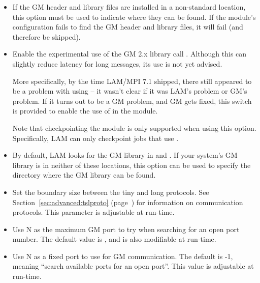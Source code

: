 \begin{itemize}


\item {}
  
  If the GM header and library files are installed in a non-standard
  location, this option must be used to indicate where they can be
  found.  If the  module's configuration fails to find the GM
  header and library files, it will fail (and therefore be skipped).


\item {}

  Enable the experimental use of the GM 2.x library call
  .  Although this can slightly reduce latency for
  long messages, its use is not yet advised.
  
  More specifically, by the time LAM/MPI 7.1 shipped, there still
  appeared to be a problem with using  -- it wasn't
  clear if it was LAM's problem or GM's problem.  If it turns out to
  be a GM problem, and GM gets fixed, this switch is provided to
  enable the use of  in the  module.

  Note that checkpointing the  module is only supported when
  using this option.  Specifically, LAM can only checkpoint 
  jobs that use .


\item {}

  By default, LAM looks for the GM library in  and
  .  If your system's GM library is in
  neither of these locations, this option can be used to specify the
  directory where the GM library can be found.




\item {}
  
  Set the boundary size between the tiny and long protocols.  See
  Section~\ref{sec:advanced:tslproto}
  (page~\pageref{sec:advanced:tslproto}) for information on
  communication protocols.  This parameter is adjustable at run-time.


\item {}
  
  Use N as the maximum GM port to try when searching for an open port
  number.  The default value is , and is also modifiable at
  run-time.


\item {}
  
  Use N as a fixed port to use for GM communication.  The default is
  -1, meaning ``search available ports for an open port''.  This value
  is adjustable at run-time.


\end{itemize}

